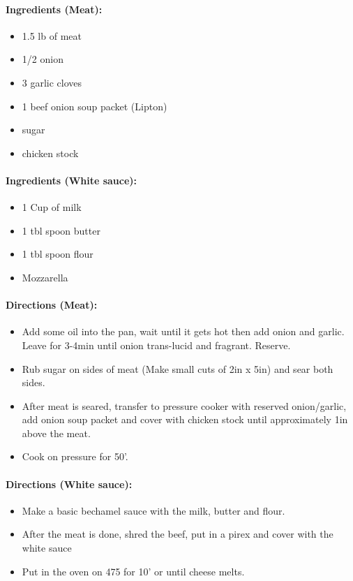 \documentclass{article}
\begin{document}
\paragraph{Ingredients (Meat):}
\begin{itemize}
	\item 1.5 lb of meat
	\item 1/2 onion
	\item 3 garlic cloves
	\item 1 beef onion soup packet (Lipton)
	\item sugar
	\item chicken stock
\end{itemize}

\paragraph{Ingredients (White sauce):}
\begin{itemize}
	\item 1 Cup of milk
	\item 1 tbl spoon butter
	\item 1 tbl spoon flour
	\item Mozzarella
\end{itemize}

\paragraph{Directions (Meat):}
\begin{itemize}
	\item Add some oil into the pan, wait until it gets hot then add onion and garlic. Leave for 3-4min until onion trans-lucid and fragrant. Reserve.
	\item Rub sugar on sides of meat (Make small cuts of 2in x 5in) and sear both sides.
	\item After meat is seared, transfer to pressure cooker with reserved onion/garlic, add onion soup packet and cover with chicken stock until approximately 1in above the meat.
	\item Cook on pressure for 50'.
\end{itemize}

\paragraph{Directions (White sauce):}
\begin{itemize}
	\item Make a basic bechamel sauce with the milk, butter and flour.
	\item After the meat is done, shred the beef, put in a pirex and cover with the white sauce
	\item Put in the oven on 475 for 10' or until cheese melts.
\end{itemize}
\end{document}
